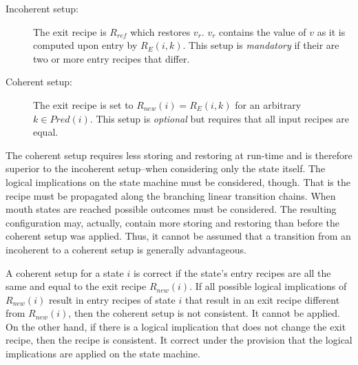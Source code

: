 \documentclass[12pt,a4paper]{scrartcl}
\begin{document}
\begin{description}

    \item[Incoherent setup:] The exit recipe is $R_{ref}$ which restores $v_r$.
        $v_r$ contains the value of $v$ as it is computed upon entry by
        $R_E(i,k)$.  This setup is \textit{mandatory} if their are two or more
        entry recipes that differ.

    \item[Coherent setup:] The exit recipe is set to $R_{new}(i)=R_E(i,k)$ for
        an arbitrary $k\in Pred(i)$. This setup is \textit{optional} but
        requires that all input recipes are equal.

\end{description}

The coherent setup requires less storing and restoring at run-time and is
therefore superior to the incoherent setup--when considering only the state
itself. The logical implications on the state machine must be considered,
though.  That is the recipe must be propagated along the branching linear
transition chains.  When mouth states are reached possible outcomes must be
considered. The resulting configuration may, actually, contain more storing and
restoring than before the coherent setup was applied.  Thus, it cannot be
assumed that a transition from an incoherent to a coherent setup is generally
advantageous.

A coherent setup for a state $i$ is correct if the state's entry recipes are
all the same and equal to the exit recipe $R_{new}(i)$. If all possible logical implications
of $R_{new}(i)$ result in entry recipes of state $i$ that result in an exit
recipe different from $R_{new}(i)$, then the coherent setup is not consistent.
It cannot be applied. On the other hand, if there is a logical implication that
does not change the exit recipe, then the recipe is consistent.  It correct
under the provision that the logical implications are applied on the state
machine.
\end{document}
